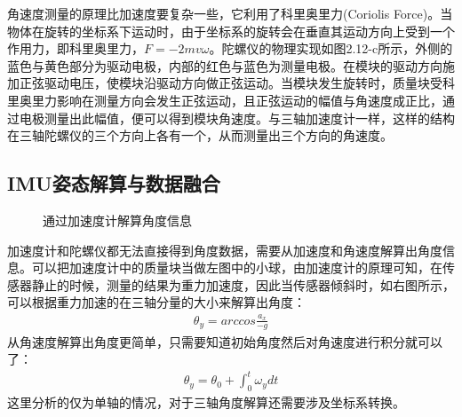 角速度测量的原理比加速度要复杂一些，它利用了科里奥里力(Coriolis Force)。当物体在旋转的坐标系下运动时，由于坐标系的旋转会在垂直其运动方向上受到一个作用力，即科里奥里力，$F=-2mvω$。陀螺仪的物理实现如图2.12-c所示，外侧的蓝色与黄色部分为驱动电极，内部的红色与蓝色为测量电极。在模块的驱动方向施加正弦驱动电压，使模块沿驱动方向做正弦运动。当模块发生旋转时，质量块受科里奥里力影响在测量方向会发生正弦运动，且正弦运动的幅值与角速度成正比，通过电极测量出此幅值，便可以得到模块角速度。与三轴加速度计一样，这样的结构在三轴陀螺仪的三个方向上各有一个，从而测量出三个方向的角速度。

\subsection{IMU姿态解算与数据融合}
\begin{figure}[htb]
    \quad
    \caption{通过加速度计解算角度信息}
    \label{fig:subfigss}
\end{figure}

加速度计和陀螺仪都无法直接得到角度数据，需要从加速度和角速度解算出角度信息。可以把加速度计中的质量块当做左图中的小球，由加速度计的原理可知，在传感器静止的时候，测量的结果为重力加速度，因此当传感器倾斜时，如右图所示，可以根据重力加速的在三轴分量的大小来解算出角度：
\begin{align}
\theta_y = arccos\frac{a_x}{-g}
\end{align}
从角速度解算出角度更简单，只需要知道初始角度然后对角速度进行积分就可以了：
\begin{align}
\theta_y = \theta_0 + \int_0^t \omega_y dt
\end{align}
这里分析的仅为单轴的情况，对于三轴角度解算还需要涉及坐标系转换。


